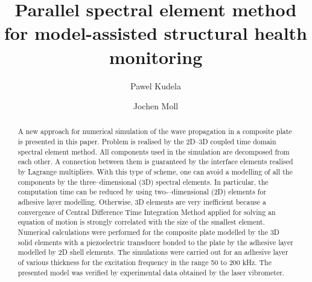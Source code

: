 \documentclass[preprint,12pt]{elsarticle}
\begin{document}
	\begin{frontmatter}
		
		\title{Parallel spectral element method for model-assisted structural health monitoring}
		
		\address[pk]{Institute of Fluid Flow Machinery, Polish Academy of Sciences, Poland}
		\address[jm]{Goethe University, Germany}
		
		\author{Pawel Kudela}
		\author{Jochen Moll}
		
		
		\begin{abstract}
			A new approach for numerical simulation of the wave propagation in a composite plate is presented in this paper. Problem is realised by the 2D--3D coupled time domain spectral element method. All components used in the simulation are decomposed from each other. A connection between them is guaranteed by the interface elements realised by Lagrange multipliers. With this type of scheme, one can avoid a modelling of all the components by the three--dimensional (3D) spectral elements. In particular, the computation time can be reduced by using two-–dimensional (2D) elements for adhesive layer modelling. Otherwise, 3D elements are very inefficient because a convergence of Central Difference Time Integration Method applied for solving an equation of motion is strongly correlated with the size of the smallest element. Numerical calculations were performed for the composite plate modelled by the 3D solid elements with a piezoelectric transducer bonded to the plate by the adhesive layer modelled by 2D shell elements. The simulations were carried out for an adhesive layer of various thickness for the excitation frequency in the range 50 to 200 kHz. The presented model was verified by experimental data obtained by the laser vibrometer.
		\end{abstract}
		

\end{frontmatter}
\end{document}
